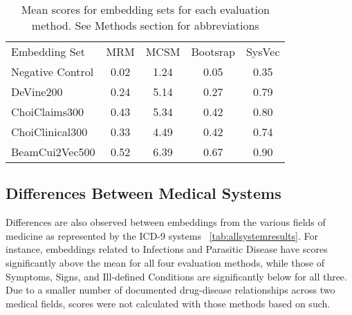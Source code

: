 \documentclass[11pt,a4paper]{article}
\begin{document}
\begin{table*}[h]
	\begin{center}
		\label{tab:allembedresults}
		\begin{tabular}{l|c|c|c|c}
			Embedding Set &MRM 	        &MCSM              &Bootsrap 	  &SysVec \\
			\hlineB{4}
			Negative Control& 0.02 & 1.24 & 0.05 & 0.35 \\	            
			DeVine200       & 0.24 & 5.14 &	0.27 & 0.79 \\
			ChoiClaims300   & 0.43 & 5.34 &	0.42 & 0.80 \\ 
			ChoiClinical300	& 0.33 & 4.49 &	0.42 & 0.74 \\
			BeamCui2Vec500	& 0.52 & 6.39 & 0.67 & 0.90 \\
		\end{tabular}
		\caption{Mean scores for embedding sets for each evaluation method. See Methods section for abbreviations}
	\end{center}
\end{table*}


\subsection{Differences Between Medical Systems}

Differences are also observed between embeddings from the various fields of medicine as represented by the ICD-9 systems ~\ref{tab:allsystemresults}. For instance, embeddings related to Infections and Parasitic Disease have scores significantly above the mean for all four evaluation methods, while those of Symptoms, Signs, and Ill-defined Conditions are significantly below for all three. Due to a smaller number of documented drug-disease relationships across two medical fields, scores were not calculated with those methods based on such.  
\end{document}
